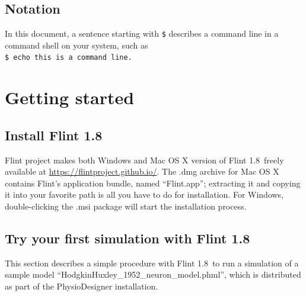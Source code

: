 \documentclass[a4paper,10pt]{report}
\def\FlintVersion{1.8}
\def\Flint{Flint \FlintVersion}
\begin{document}
\section{Notation}
In this document, a sentence starting with {\tt \$} describes a command line in
a command shell on your system, such as\\
{\tt \$ echo this is a command line.}



\chapter{Getting started}

\section{Install \Flint}
Flint project makes both Windows and Mac OS X version of \Flint\ freely
available at \url{https://flintproject.github.io/}.
The .dmg archive for Mac OS X contains Flint's application bundle, named
``Flint.app''; extracting it and copying it into your favorite path is all
you have to do for installation.
For Windows, double-clicking the .msi package will start the installation
process.

\section{Try your first simulation with \Flint}
This section describes a simple procedure with \Flint\ to run a simulation of a
sample model ``HodgkinHuxley\_1952\_neuron\_model.phml'', which is distributed
as part of the PhysioDesigner installation.
\end{document}
